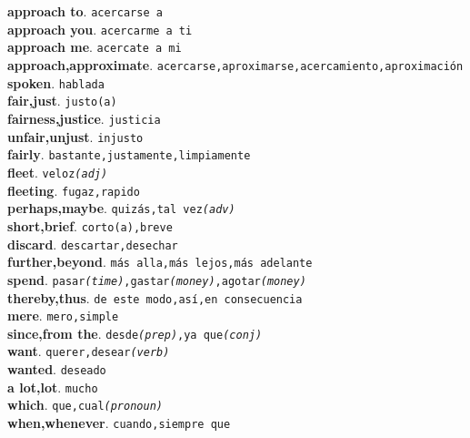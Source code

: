 \documentclass[twocolumn]{article}
\begin{document}
	\textsf{\textbf{approach to}}. \texttt{acercarse a}\\
	\textsf{\textbf{approach you}}. \texttt{acercarme a ti}\\
	\textsf{\textbf{approach me}}. \texttt{acercate a mi}\\
	\textsf{\textbf{approach,approximate}}. \texttt{acercarse,aproximarse,acercamiento,aproximaci\'on}\\
	\textsf{\textbf{spoken}}. \texttt{hablada}\\
	\textsf{\textbf{fair,just}}. \texttt{justo(a)}\\
	\textsf{\textbf{fairness,justice}}. \texttt{justicia}\\
	\textsf{\textbf{unfair,unjust}}. \texttt{injusto}\\
	\textsf{\textbf{fairly}}. \texttt{bastante,justamente,limpiamente}\\
	\textsf{\textbf{fleet}}. \texttt{veloz{\scriptsize \textsl{(adj)}}}\\
	\textsf{\textbf{fleeting}}. \texttt{fugaz,rapido}\\
	\textsf{\textbf{perhaps,maybe}}. \texttt{quiz\'as,tal vez{\scriptsize \textsl{(adv)}}}\\
	\textsf{\textbf{short,brief}}. \texttt{corto(a),breve}\\
	\textsf{\textbf{discard}}. \texttt{descartar,desechar}\\
	\textsf{\textbf{further,beyond}}. \texttt{m\'as alla,m\'as lejos,m\'as adelante}\\
	\textsf{\textbf{spend}}. \texttt{pasar{\scriptsize \textsl{(time)}},gastar{\scriptsize \textsl{(money)}},agotar{\scriptsize \textsl{(money)}}}\\
	\textsf{\textbf{thereby,thus}}. \texttt{de este modo,as\'i,en consecuencia}\\
	\textsf{\textbf{mere}}. \texttt{mero,simple}\\
	\textsf{\textbf{since,from the}}. \texttt{desde{\scriptsize \textsl{(prep)}},ya que{\scriptsize \textsl{(conj)}}}\\
	\textsf{\textbf{want}}. \texttt{querer,desear{\scriptsize \textsl{(verb)}}}\\
	\textsf{\textbf{wanted}}. \texttt{deseado}\\
	\textsf{\textbf{a lot,lot}}. \texttt{mucho}\\
	\textsf{\textbf{which}}. \texttt{que,cual{\scriptsize \textsl{(pronoun)}}}\\
	\textsf{\textbf{when,whenever}}. \texttt{cuando,siempre que}\\
\end{document}

